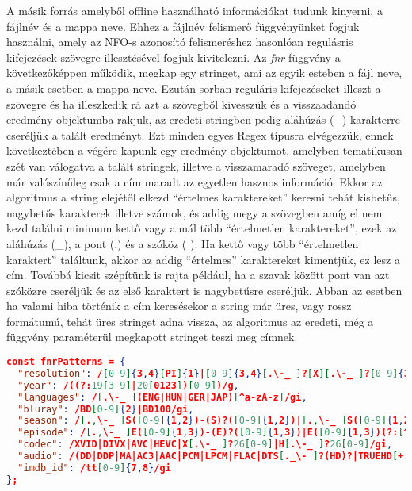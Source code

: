 A másik forrás amelyből offline használható információkat tudunk kinyerni, a fájlnév és a mappa neve. Ehhez a fájlnév felismerő függvényünket fogjuk használni, amely az NFO-s azonosító felismeréshez hasonlóan regulásris kifejezések szövegre illesztésével fogjuk kivitelezni.
Az {\it fnr} függvény a következőképpen működik, megkap egy stringet, ami az egyik esteben a fájl neve, a másik esetben a mappa neve. Ezután sorban reguláris kifejezéseket illeszt a szövegre és ha illeszkedik rá azt a szövegből kivesszük és a visszaadandó eredmény objektumba rakjuk, az eredeti stringben pedig aláhúzás (\_) karakterre cseréljük a talált eredményt. Ezt minden egyes Regex típusra elvégezzük, ennek következtében a végére kapunk egy eredmény objektumot, amelyben tematikusan szét van válogatva a talált stringek, illetve a visszamaradó szöveget, amelyben már valószínűleg csak a cím maradt az egyetlen hasznos információ. Ekkor az algoritmus a string elejétől elkezd ``értelmes karaktereket'' keresni tehát kisbetűs, nagybetűs karakterek illetve számok, és addig megy a szövegben amíg el nem kezd találni minimum kettő vagy annál több ``értelmetlen karaktereket'', ezek az aláhúzás (\_), a pont (.) és a szóköz ( ). Ha kettő vagy több ``értelmetlen karaktert'' találtunk, akkor az addig ``értelmes'' karaktereket kimentjük, ez lesz a cím. Továbbá kicsit szépítünk is rajta például, ha a szavak között pont van azt szóközre cseréljük és az első karaktert is nagybetűsre cseréljük. Abban az esetben ha valami hiba történik a cím keresésekor a string már üres, vagy rossz formátumú, tehát üres stringet adna vissza, az algoritmus az eredeti, még a függvény paraméterül megkapott stringet teszi meg címnek.

\begin{lstlisting}[language={json}]
const fnrPatterns = {
  "resolution": /[0-9]{3,4}[PI]{1}|[0-9]{3,4}[.\-_ ]?[X][.\-_ ]?[0-9]{3,4}/gi,
  "year": /((?:19[3-9]|20[0123])[0-9])/g,
  "languages": /[.\-_ ](ENG|HUN|GER|JAP)[^a-zA-z]/gi,
  "bluray": /BD[0-9]{2}|BD100/gi,
  "season": /[.,\-_ ]S([0-9]{1,2})-(S)?([0-9]{1,2})|[.,\-_ ]S([0-9]{1,2})|[^0-9]([0-9]{1,2})X/gi,
  "episode": /[.,\-_ ]E([0-9]{1,3})-(E)?([0-9]{1,3})|E([0-9]{1,3})(?:[^0-9]|$)|[Xx]([0-9]{1,3})(?:[^0-9]|$)|(EP|EPISODE)([0-9]{1,3})(?:[^0-9]|$)/gi,
  "codec": /XVID|DIVX|AVC|HEVC|X[.\-_ ]?26[0-9]|H[.\-_ ]?26[0-9]/gi,
  "audio": /(DD|DDP|MA|AC3|AAC|PCM|LPCM|FLAC|DTS[._\- ]?(HD)?|TRUEHD[+._\- ]?ATMOS|TRUEHD|ATMOS)[+._\- ]?[0-9]\.?[0-9]|DTS[._\- ]?(HD|ES)?|DUAL[._\- ]?AUDIO|DOLBY[+._\- ]?(DIGITAL[+._\- ]?(PLUS)?|VISION|ATMOS)|HALF-OU/gi,
  "imdb_id": /tt[0-9]{7,8}/gi
};
\end{lstlisting}

